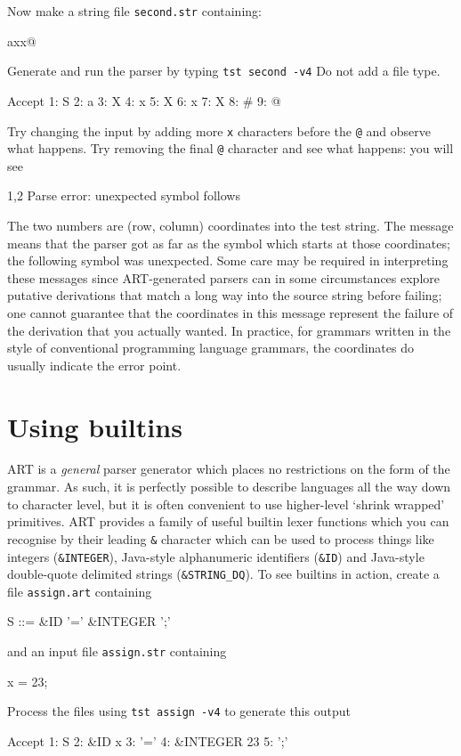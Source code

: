 \noindent Now make a string file {\tt second.str} containing:
\begin{codeblock}
axx@
\end{codeblock}
Generate and run the parser by typing \verb+tst second -v4+ Do not add a file type. 
\begin{codeblock}
Accept
1: S
  2: a
  3: X
    4: x
    5: X
      6: x
      7: X
        8: #
  9: @
\end{codeblock}
Try changing the input by adding more \verb+x+ characters before the \verb+@+ and observe what happens.
Try removing the final \verb+@+ character and see what happens: you will see
\begin{codeblock}
1,2 Parse error: unexpected symbol follows
\end{codeblock}
The two numbers are (row, column) coordinates into the test string. The message means that the parser got as far as the symbol which starts at those coordinates; the following symbol was unexpected. Some care may be required in interpreting these messages since ART-generated parsers can in some circumstances explore putative derivations that match a long way into the source string before failing; one cannot guarantee that the coordinates in this message represent the failure of the derivation that you actually wanted. In practice, for grammars written in the style of conventional programming language grammars, the coordinates do usually indicate the error point.

\section{Using builtins}
ART is a {\em general} parser generator which places no restrictions on the form of the grammar. As such, 
it is perfectly possible to describe languages all the way down to character level, but it is often convenient to use higher-level `shrink wrapped' primitives. ART provides a family of useful builtin lexer functions which you can recognise by their leading \verb+&+ character which can be used to process things like integers (\verb+&INTEGER+), Java-style alphanumeric identifiers (\verb+&ID+) and Java-style double-quote delimited strings (\verb+&STRING_DQ+). To see builtins in action, create a file {\tt assign.art} containing

\begin{codeblock}
S ::= &ID '=' &INTEGER ';' 
\end{codeblock}
and an input file {\tt assign.str} containing
\begin{codeblock}
x = 23;
\end{codeblock}
Process the files using {\tt tst assign -v4} to generate this output
\begin{codeblock}
Accept
1: S
  2: &ID x
  3: '='
  4: &INTEGER  23
  5: ';'
\end{codeblock}

